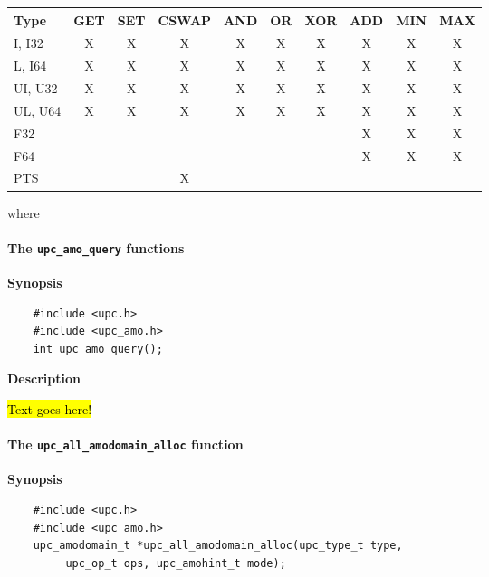 \begin{center}
\begin{tabular}{l|ccccccccc}
Type    & GET & SET & CSWAP & AND & OR  & XOR & ADD & MIN & MAX \\ \hline
I, I32  &  X  &  X  &   X   &  X  &  X  &  X  &  X  &  X  &  X  \\
L, I64  &  X  &  X  &   X   &  X  &  X  &  X  &  X  &  X  &  X  \\
UI, U32 &  X  &  X  &   X   &  X  &  X  &  X  &  X  &  X  &  X  \\
UL, U64 &  X  &  X  &   X   &  X  &  X  &  X  &  X  &  X  &  X  \\
F32     &     &     &       &     &     &     &  X  &  X  &  X  \\
F64     &     &     &       &     &     &     &  X  &  X  &  X  \\
PTS     &     &     &   X   &     &     &     &     &     &     \\
\end{tabular}
\end{center}

where 

\paragraph{The {\tt upc\_amo\_query} functions}

{\bf Synopsis}

\npf\vspace{-1.8em}
\begin{verbatim}
    #include <upc.h>
    #include <upc_amo.h>
    int upc_amo_query();
\end{verbatim}

{\bf Description}

\np \hl{Text goes here!}

\paragraph{The {\tt upc\_all\_amodomain\_alloc} function}

{\bf Synopsis}

\npf\vspace{-1.8em}
\begin{verbatim}
    #include <upc.h>
    #include <upc_amo.h>
    upc_amodomain_t *upc_all_amodomain_alloc(upc_type_t type,
         upc_op_t ops, upc_amohint_t mode);
\end{verbatim}

